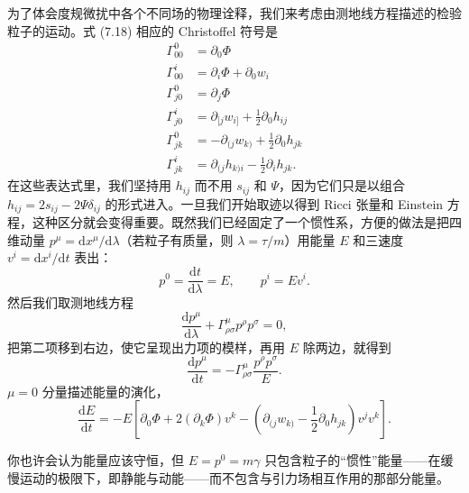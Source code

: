 为了体会度规微扰中各个不同场的物理诠释，我们来考虑由测地线方程描述的检验粒子的运动。式 (7.18) 相应的 Christoffel 符号是
\begin{align*}
\Gamma^{0}_{00} &= \partial_{0}\Phi \\
\Gamma^{i}_{00} &= \partial_{i}\Phi + \partial_{0}w_{i} \\
\Gamma^{0}_{j0} &= \partial_{j}\Phi \\
\Gamma^{i}_{j0} &= \partial_{[j}w_{i]} + \frac{1}{2}\partial_{0}h_{ij} \\
\Gamma^{0}_{jk} &= -\partial_{(j}w_{k)} + \frac{1}{2}\partial_{0}h_{jk} \\
\Gamma^{i}_{jk} &= \partial_{(j}h_{k)i} - \frac{1}{2}\partial_{i}h_{jk}.
\tag{7.19}
\end{align*}
在这些表达式里，我们坚持用 $h_{ij}$ 而不用 $s_{ij}$ 和 $\Psi$，因为它们只是以组合 $h_{ij} = 2s_{ij} - 2\Psi\delta_{ij}$ 的形式进入。一旦我们开始取迹以得到 Ricci 张量和 Einstein 方程，这种区分就会变得重要。既然我们已经固定了一个惯性系，方便的做法是把四维动量 $p^{\mu} = \mathrm{d}x^{\mu}/\mathrm{d}\lambda$（若粒子有质量，则 $\lambda = \tau/m$）用能量 $E$ 和三速度 $v^{i} = \mathrm{d}x^{i}/\mathrm{d}t$ 表出：
\begin{equation*}
p^{0} = \frac{\mathrm{d}t}{\mathrm{d}\lambda} = E, \qquad p^{i} = Ev^{i}.
\tag{7.20}
\end{equation*}
然后我们取测地线方程
\begin{equation*}
\frac{\mathrm{d}p^{\mu}}{\mathrm{d}\lambda} + \Gamma^{\mu}_{\rho\sigma}p^{\rho}p^{\sigma} = 0,
\tag{7.21}
\end{equation*}
把第二项移到右边，使它呈现出力项的模样，再用 $E$ 除两边，就得到
\begin{equation*}
\frac{\mathrm{d}p^{\mu}}{\mathrm{d}t} = -\Gamma^{\mu}_{\rho\sigma}\frac{p^{\rho}p^{\sigma}}{E}.
\tag{7.22}
\end{equation*}
$\mu = 0$ 分量描述能量的演化，
\begin{equation*}
\frac{\mathrm{d}E}{\mathrm{d}t} = -E\left[\partial_{0}\Phi + 2(\partial_{k}\Phi)v^{k} - \left(\partial_{(j}w_{k)} - \frac{1}{2}\partial_{0}h_{jk}\right)v^{j}v^{k}\right].
\tag{7.23}
\end{equation*}

你也许会认为能量应该守恒，但 $E = p^{0} = m\gamma$ 只包含粒子的“惯性”能量——在缓慢运动的极限下，即静能与动能——而不包含与引力场相互作用的那部分能量。


